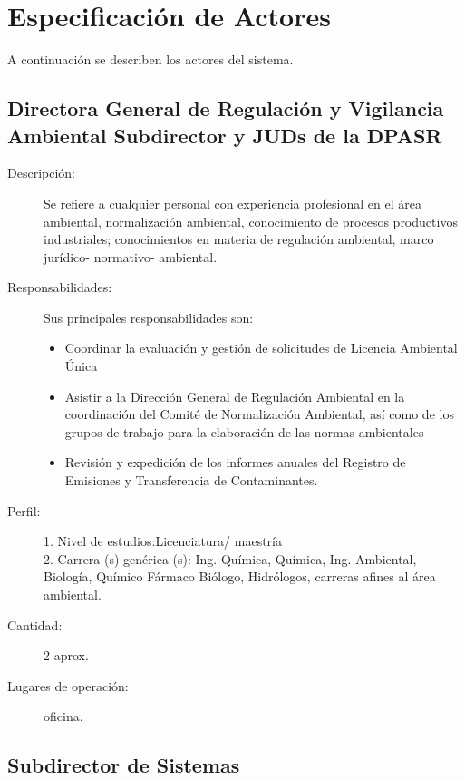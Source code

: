 \section{Especificación de Actores}
	 A continuación se describen los actores del sistema.

\subsection{Directora General de Regulación y Vigilancia Ambiental
	Subdirector y JUDs de la DPASR}

\begin{description}
	\item[Descripción: ] Se refiere a cualquier personal con   experiencia profesional en el área ambiental, normalización ambiental, conocimiento de procesos productivos industriales; conocimientos en materia de regulación ambiental, marco jurídico- normativo- ambiental.
	\item[Responsabilidades: ] Sus principales responsabilidades son:
		\begin{itemize}
		 	\item Coordinar la evaluación y gestión de solicitudes de Licencia Ambiental Única 
			\item Asistir a la Dirección General de Regulación Ambiental en la coordinación del Comité de Normalización Ambiental, así como de los grupos de trabajo para la elaboración de las normas ambientales 
			\item Revisión y expedición de los informes anuales del Registro de Emisiones y Transferencia de Contaminantes. 
			
		\end{itemize}
	\item[Perfil: ]	1. Nivel de estudios:Licenciatura/ maestría
\\	2. Carrera (s) genérica (s): Ing. Química, Química, Ing. Ambiental, Biología, Químico Fármaco Biólogo, Hidrólogos, carreras afines al área ambiental.
	\item[Cantidad: ] 2 aprox.
	\item[Lugares de operación: ]  oficina.
\end{description}

\subsection{Subdirector de Sistemas}

